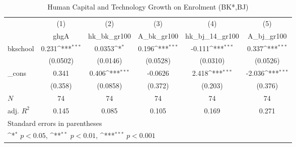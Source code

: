\begin{table}[htbp]\centering
\def\sym#1{\ifmmode^{#1}\else\(^{#1}\)\fi}
\caption{Human Capital and Technology Growth on Enrolment (BK*,BJ)}
\begin{tabular}{l*{5}{c}}
\toprule
            &\multicolumn{1}{c}{(1)}&\multicolumn{1}{c}{(2)}&\multicolumn{1}{c}{(3)}&\multicolumn{1}{c}{(4)}&\multicolumn{1}{c}{(5)}\\
            &\multicolumn{1}{c}{ghgA}&\multicolumn{1}{c}{hk\_bk\_gr100}&\multicolumn{1}{c}{A\_bk\_gr100}&\multicolumn{1}{c}{hk\_bj\_14\_gr100}&\multicolumn{1}{c}{A\_bj\_gr100}\\
\midrule
bkschool    &       0.231\sym{***}&      0.0353\sym{*}  &       0.196\sym{***}&      -0.111\sym{***}&       0.337\sym{***}\\
            &    (0.0502)         &    (0.0146)         &    (0.0528)         &    (0.0310)         &    (0.0526)         \\
\addlinespace
\_cons      &       0.341         &       0.406\sym{***}&     -0.0626         &       2.418\sym{***}&      -2.036\sym{***}\\
            &     (0.358)         &    (0.0858)         &     (0.372)         &     (0.203)         &     (0.376)         \\
\midrule
\(N\)       &          74         &          74         &          74         &          74         &          74         \\
adj. \(R^{2}\)&       0.145         &       0.085         &       0.105         &       0.169         &       0.271         \\
\bottomrule
\multicolumn{6}{l}{\footnotesize Standard errors in parentheses}\\
\multicolumn{6}{l}{\footnotesize \sym{*} \(p<0.05\), \sym{**} \(p<0.01\), \sym{***} \(p<0.001\)}\\
\end{tabular}
\end{table}
